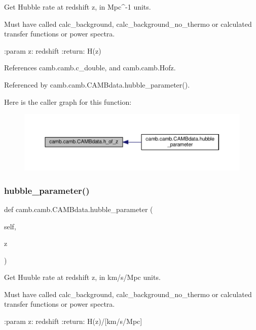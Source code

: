 \begin{DoxyVerb}Get Hubble rate at redshift z, in Mpc^{-1} units.

Must have called calc_background, calc_background_no_thermo or calculated transfer functions or power spectra.

:param z: redshift
:return: H(z)
\end{DoxyVerb}
 

References camb.\+camb.\+c\+\_\+double, and camb.\+camb.\+Hofz.



Referenced by camb.\+camb.\+C\+A\+M\+Bdata.\+hubble\+\_\+parameter().

Here is the caller graph for this function\+:
\nopagebreak
\begin{figure}[H]
\begin{center}
\leavevmode
\includegraphics[width=350pt]{classcamb_1_1camb_1_1CAMBdata_a19e14cac73b780bba9087500f650d78c_icgraph}
\end{center}
\end{figure}
\mbox{\label{classcamb_1_1camb_1_1CAMBdata_ad9700493862b05ad5d794ffeae824049}} 
\subsubsection{\texorpdfstring{hubble\+\_\+parameter()}{hubble\_parameter()}}
{\footnotesize\ttfamily def camb.\+camb.\+C\+A\+M\+Bdata.\+hubble\+\_\+parameter (\begin{DoxyParamCaption}\item[{}]{self,  }\item[{}]{z }\end{DoxyParamCaption})}

\begin{DoxyVerb}Get Huuble rate at redshift z, in km/s/Mpc units.

Must have called calc_background, calc_background_no_thermo or calculated transfer functions or power spectra.

:param z: redshift
:return: H(z)/[km/s/Mpc]
\end{DoxyVerb}
 

